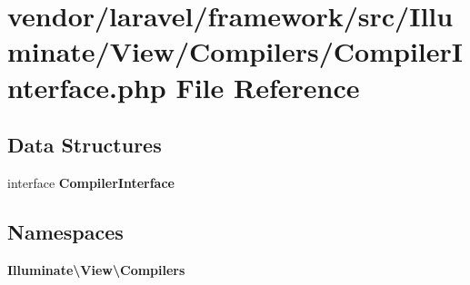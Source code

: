 \section{vendor/laravel/framework/src/\+Illuminate/\+View/\+Compilers/\+Compiler\+Interface.php File Reference}
\label{_compiler_interface_8php}
\subsection*{Data Structures}
\begin{DoxyCompactItemize}
\item 
interface {\bf Compiler\+Interface}
\end{DoxyCompactItemize}
\subsection*{Namespaces}
\begin{DoxyCompactItemize}
\item 
 {\bf Illuminate\textbackslash{}\+View\textbackslash{}\+Compilers}
\end{DoxyCompactItemize}
